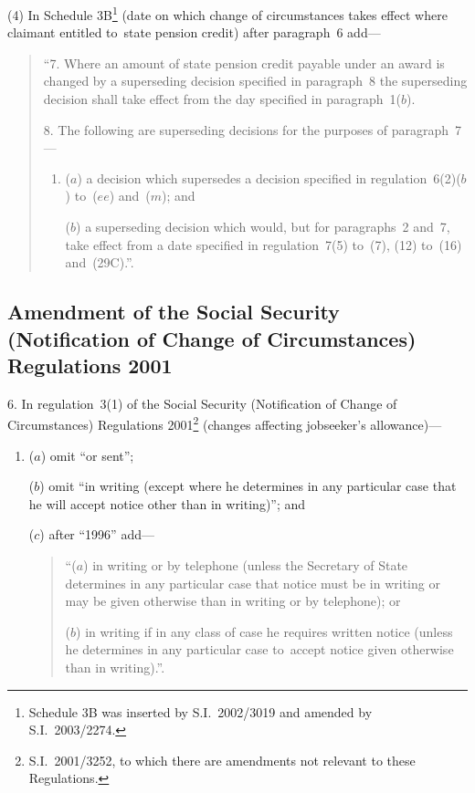 \documentclass[12pt,a4paper]{article}
\begin{document}
(4) In Schedule 3B\footnote{Schedule 3B was inserted by S.I.~2002/3019 and amended by S.I.~2003/2274.} (date on which change of circumstances takes effect where claimant entitled to~state pension credit) after paragraph~6 add—
\begin{quotation}
“7.  Where an amount of state pension credit payable under an award is changed by a superseding decision specified in paragraph~8 the superseding decision shall take effect from the day specified in paragraph~1($b$).

\medskip

8.  The following are superseding decisions for the purposes of paragraph~7—
\begin{enumerate}\item[]
($a$) a decision which supersedes a decision specified in regulation~6(2)($b$)  to~($ee$)  and~($m$); and

\enlargethispage{\baselineskip}

($b$) a superseding decision which would, but for paragraphs~2 and~7, take effect from a date specified in regulation~7(5) to~(7), (12) to~(16) and~(29C).”.
\end{enumerate}
\end{quotation}

\subsection[6. Amendment of the Social Security (Notification of Change of Circumstances) Regulations 2001]{\sloppy Amendment of the Social Security (Notification of Change of Circumstances) Regulations 2001}

6.  In regulation~3(1) of the Social Security (Notification of Change of Circumstances) Regulations 2001\footnote{S.I.~2001/3252, to which there are amendments not relevant to these Regulations.} (changes affecting jobseeker’s allowance)—
\begin{enumerate}\item[]
($a$) omit “or sent”;

($b$) omit “in writing (except where he determines in any particular case that he will accept notice other than in writing)”; and

($c$) after “1996” add—
\begin{quotation}
“($a$) in writing or by telephone (unless the Secretary of State determines in any particular case that notice must be in writing or may be given otherwise than in writing or by telephone); or

($b$) in writing if in any class of case he requires written notice (unless he determines in any particular case to~accept notice given otherwise than in writing).”.
\end{quotation}
\end{enumerate}
\end{document}
